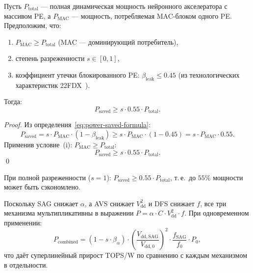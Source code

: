 \begin{theorem}
\label{thm:power-bound}
Пусть $P_{\mathrm{total}}$ — полная динамическая мощность
нейронного акселератора с массивом PE, а $P_{\mathrm{MAC}}$
— мощность, потребляемая MAC-блоком одного PE.
Предположим, что:
\begin{enumerate}[label=(\roman*)]
  \item $P_{\mathrm{MAC}} \geq P_{\mathrm{total}}$
        (MAC — доминирующий потребитель),
  \item степень разреженности $s \in [0, 1]$,
  \item коэффициент утечки блокированного PE:
        $\beta_{\mathrm{leak}} \leq 0{.}45$
        (из технологических характеристик 22FDX~\cite{IRDS2023-MoreMoore}).
\end{enumerate}
Тогда:
\begin{equation}
  P_{\mathrm{saved}} \geq s \cdot 0{.}55 \cdot P_{\mathrm{total}}.
  \label{eq:thm-power}
\end{equation}
\end{theorem}

\begin{proof}
Из определения~\eqref{eq:power-saved-formula}:
\[
  P_{\mathrm{saved}}
  = s \cdot P_{\mathrm{MAC}} \cdot (1 - \beta_{\mathrm{leak}})
  \geq s \cdot P_{\mathrm{MAC}} \cdot (1 - 0{.}45)
  = s \cdot P_{\mathrm{MAC}} \cdot 0{.}55.
\]
Применив условие~(i): $P_{\mathrm{MAC}} \geq P_{\mathrm{total}}$:
\[
  P_{\mathrm{saved}} \geq s \cdot 0{.}55 \cdot P_{\mathrm{total}}.
\]
\qed
\end{proof}

\begin{corollary}
\label{cor:max-power}
При полной разреженности ($s = 1$):
$P_{\mathrm{saved}} \geq 0{.}55 \cdot P_{\mathrm{total}}$,
т.\,е.\ до $55\%$ мощности может быть сэкономлено.
\end{corollary}

\begin{corollary}
\label{cor:compat-avs-dfs}
Поскольку SAG снижает $\alpha$, а AVS снижает $V_{\mathrm{dd}}^2$
и DFS снижает $f$, все три механизма мультипликативны в выражении
$P = \alpha \cdot C \cdot V_{\mathrm{dd}}^2 \cdot f$.
При одновременном применении:
\[
  P_{\mathrm{combined}} = (1 - s \cdot \beta_{\alpha}) \cdot
  \left(\frac{V_{\mathrm{dd,SAG}}}{V_{\mathrm{dd,0}}}\right)^2 \cdot
  \frac{f_{\mathrm{SAG}}}{f_0} \cdot P_0,
\]
что даёт суперлинейный прирост TOPS/W по сравнению с каждым
механизмом в отдельности.
\end{corollary}

